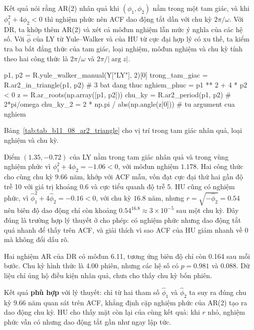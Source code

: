  Kết quả  nói rằng AR(2) nhân quả khi $(\phi_1,\phi_2)$ nằm trong một tam giác, và khi $\phi_1^2+4\phi_2<0$ thì nghiệm phức nên ACF dao động tắt dần với chu kỳ $2\pi/\omega$.
 Với DR, ta khớp thêm AR(2) và xét cả môđun nghiệm lẫn mức ý nghĩa của các hệ số. Với $\hat\phi$ của LY từ Yule--Walker và của HU từ cực đại hợp lý có xu thế, ta kiểm tra ba bất đẳng thức của tam giác, loại nghiệm, môđun nghiệm và chu kỳ tính theo hai công thức là $2\pi/\omega$ và $2\pi/|\arg z|$.
\begin{codeblock}
p1, p2 = R.yule_walker_manual(Y["LY"], 2)[0]
trong_tam_giac = R.ar2_in_triangle(p1, p2)         # 3 bat dang thuc
nghiem_phuc = p1 ** 2 + 4 * p2 < 0
z = R.ar_roots(np.array([p1, p2]))
chu_ky = R.ar2_period(p1, p2)                      # 2*pi/omega
chu_ky_2 = 2 * np.pi / abs(np.angle(z[0]))         # tu argument cua nghiem
\end{codeblock}
 Bảng~\ref{tab:tab_b11_08_ar2_triangle} cho vị trí trong tam giác nhân quả, loại nghiệm và chu kỳ.

 Điểm $(1.35,-0.72)$ của LY nằm trong tam giác nhân quả và trong vùng nghiệm phức vì $\phi_1^2+4\phi_2=-1.06<0$, với môđun nghiệm $1.178$. Hai công thức cho cùng chu kỳ $9.66$ năm, khớp với ACF mẫu, vốn đạt cực đại thứ hai gần độ trễ 10 với giá trị khoảng $0.6$ và cực tiểu quanh độ trễ 5. HU cũng có nghiệm phức, vì $\hat\phi_1^2+4\hat\phi_2=-0.16<0$, với chu kỳ $16.8$ năm, nhưng $r=\sqrt{-\hat\phi_2}=0.54$ nên biên độ dao động chỉ còn khoảng $0.54^{16.8}\approx3\times10^{-5}$ sau một chu kỳ. Đây đúng là trường hợp lý thuyết ở  cho phép: có nghiệm phức nhưng dao động tắt quá nhanh để thấy trên ACF, và giải thích vì sao ACF của HU giảm nhanh về $0$ mà không đổi dấu rõ.

Hai nghiệm AR của DR có môđun 6.11, tương ứng biên độ chỉ còn 0.164 sau mỗi bước. Chu kỳ hình thức là 4.00 phiên, nhưng các hệ số có $p=0.981$ và $0.088$. Dữ liệu chỉ ủng hộ điều kiện nhân quả, chưa cho thấy chu kỳ bốn phiên.

 Kết quả \textbf{phù hợp} với lý thuyết: chỉ từ hai tham số $\hat\phi_1$ và $\hat\phi_2$ ta suy ra đúng chu kỳ $9.66$ năm quan sát trên ACF, khẳng định cặp nghiệm phức của AR(2) tạo ra dao động chu kỳ. HU cho thấy mặt còn lại của cùng kết quả: khi $r$ nhỏ, nghiệm phức vẫn có nhưng dao động tắt gần như ngay lập tức.

